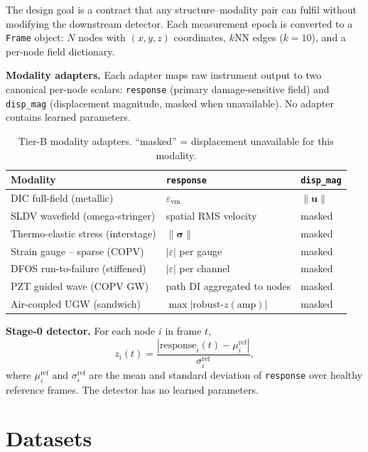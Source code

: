 \documentclass[10pt]{llncs}      %
\begin{document}
The design goal is a contract that any structure--modality pair can fulfil
without modifying the downstream detector.
Each measurement epoch is converted to a \texttt{Frame} object: $N$ nodes with
$(x,y,z)$ coordinates, $k$NN edges ($k=10$), and a per-node field dictionary.

\textbf{Modality adapters.}
Each adapter maps raw instrument output to two canonical per-node scalars:
\texttt{response} (primary damage-sensitive field) and
\texttt{disp\_mag} (displacement magnitude, masked when unavailable).
No adapter contains learned parameters.

\begin{table}[h]
  \caption{Tier-B modality adapters. ``masked'' = displacement unavailable
           for this modality.}
  \label{tab:adapters}
  \small
  \centering
  \begin{tabular}{lll}
    \toprule
    Modality & \texttt{response} & \texttt{disp\_mag} \\
    \midrule
    DIC full-field (metallic) & $\varepsilon_\mathrm{vm}$ & $\|\mathbf{u}\|$ \\
    SLDV wavefield (omega-stringer) & spatial RMS velocity & masked \\
    Thermo-elastic stress (interstage) & $\|\boldsymbol{\sigma}\|$ & masked \\
    Strain gauge -- sparse (COPV) & $|\varepsilon|$ per gauge & masked \\
    DFOS run-to-failure (stiffened) & $|\varepsilon|$ per channel & masked \\
    PZT guided wave (COPV GW) & path DI aggregated to nodes & masked \\
    Air-coupled UGW (sandwich) & $\max|\text{robust-}z(\text{amp})|$ & masked \\
    \bottomrule
  \end{tabular}
\end{table}

\textbf{Stage-0 detector.}
For each node $i$ in frame $t$,
\begin{equation}
  z_i(t) = \frac{|\text{response}_i(t) - \mu_i^{\text{ref}}|}
                 {\sigma_i^{\text{ref}}},
\end{equation}
where $\mu_i^{\text{ref}}$ and $\sigma_i^{\text{ref}}$ are the mean and
standard deviation of \texttt{response} over healthy reference frames.
The detector has no learned parameters.

\section{Datasets}
\label{sec:data}
\end{document}
